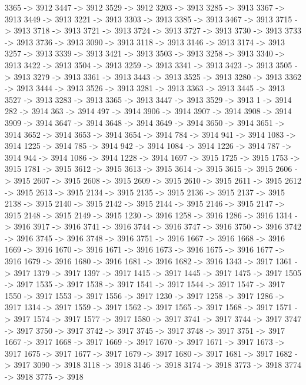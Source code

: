 {	3365 -> 3912
	3447 -> 3912
	3529 -> 3912
	3203 -> 3913
	3285 -> 3913
	3367 -> 3913
	3449 -> 3913
	3221 -> 3913
	3303 -> 3913
	3385 -> 3913
	3467 -> 3913
	3715 -> 3913
	3718 -> 3913
	3721 -> 3913
	3724 -> 3913
	3727 -> 3913
	3730 -> 3913
	3733 -> 3913
	3736 -> 3913
	3090 -> 3913
	3118 -> 3913
	3146 -> 3913
	3174 -> 3913
	3257 -> 3913
	3339 -> 3913
	3421 -> 3913
	3503 -> 3913
	3258 -> 3913
	3340 -> 3913
	3422 -> 3913
	3504 -> 3913
	3259 -> 3913
	3341 -> 3913
	3423 -> 3913
	3505 -> 3913
	3279 -> 3913
	3361 -> 3913
	3443 -> 3913
	3525 -> 3913
	3280 -> 3913
	3362 -> 3913
	3444 -> 3913
	3526 -> 3913
	3281 -> 3913
	3363 -> 3913
	3445 -> 3913
	3527 -> 3913
	3283 -> 3913
	3365 -> 3913
	3447 -> 3913
	3529 -> 3913
	1 -> 3914
	282 -> 3914
	363 -> 3914
	497 -> 3914
	3906 -> 3914
	3907 -> 3914
	3908 -> 3914
	3909 -> 3914
	3647 -> 3914
	3648 -> 3914
	3649 -> 3914
	3650 -> 3914
	3651 -> 3914
	3652 -> 3914
	3653 -> 3914
	3654 -> 3914
	784 -> 3914
	941 -> 3914
	1083 -> 3914
	1225 -> 3914
	785 -> 3914
	942 -> 3914
	1084 -> 3914
	1226 -> 3914
	787 -> 3914
	944 -> 3914
	1086 -> 3914
	1228 -> 3914
	1697 -> 3915
	1725 -> 3915
	1753 -> 3915
	1781 -> 3915
	3612 -> 3915
	3613 -> 3915
	3614 -> 3915
	3615 -> 3915
	2606 -> 3915
	2607 -> 3915
	2608 -> 3915
	2609 -> 3915
	2610 -> 3915
	2611 -> 3915
	2612 -> 3915
	2613 -> 3915
	2134 -> 3915
	2135 -> 3915
	2136 -> 3915
	2137 -> 3915
	2138 -> 3915
	2140 -> 3915
	2142 -> 3915
	2144 -> 3915
	2146 -> 3915
	2147 -> 3915
	2148 -> 3915
	2149 -> 3915
	1230 -> 3916
	1258 -> 3916
	1286 -> 3916
	1314 -> 3916
	3917 -> 3916
	3741 -> 3916
	3744 -> 3916
	3747 -> 3916
	3750 -> 3916
	3742 -> 3916
	3745 -> 3916
	3748 -> 3916
	3751 -> 3916
	1667 -> 3916
	1668 -> 3916
	1669 -> 3916
	1670 -> 3916
	1671 -> 3916
	1673 -> 3916
	1675 -> 3916
	1677 -> 3916
	1679 -> 3916
	1680 -> 3916
	1681 -> 3916
	1682 -> 3916
	1343 -> 3917
	1361 -> 3917
	1379 -> 3917
	1397 -> 3917
	1415 -> 3917
	1445 -> 3917
	1475 -> 3917
	1505 -> 3917
	1535 -> 3917
	1538 -> 3917
	1541 -> 3917
	1544 -> 3917
	1547 -> 3917
	1550 -> 3917
	1553 -> 3917
	1556 -> 3917
	1230 -> 3917
	1258 -> 3917
	1286 -> 3917
	1314 -> 3917
	1559 -> 3917
	1562 -> 3917
	1565 -> 3917
	1568 -> 3917
	1571 -> 3917
	1574 -> 3917
	1577 -> 3917
	1580 -> 3917
	3741 -> 3917
	3744 -> 3917
	3747 -> 3917
	3750 -> 3917
	3742 -> 3917
	3745 -> 3917
	3748 -> 3917
	3751 -> 3917
	1667 -> 3917
	1668 -> 3917
	1669 -> 3917
	1670 -> 3917
	1671 -> 3917
	1673 -> 3917
	1675 -> 3917
	1677 -> 3917
	1679 -> 3917
	1680 -> 3917
	1681 -> 3917
	1682 -> 3917
	3090 -> 3918
	3118 -> 3918
	3146 -> 3918
	3174 -> 3918
	3773 -> 3918
	3774 -> 3918
	3775 -> 3918
}
